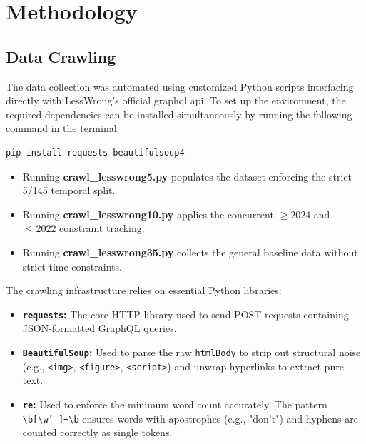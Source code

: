 \documentclass[12pt, a4paper]{article}
\begin{document}
\section{Methodology}

\subsection{Data Crawling}
The data collection was automated using customized Python scripts interfacing directly with LessWrong's official graphql api. To set up the environment, the required dependencies can be installed simultaneously by running the following command in the terminal:

\begin{center}
\begin{minipage}{0.55\textwidth}
\begin{lstlisting}[language=bash]
pip install requests beautifulsoup4
\end{lstlisting}
\end{minipage}
\end{center}

\begin{itemize}
    \item Running \textbf{crawl\_lesswrong5.py} populates the dataset enforcing the strict 5/145 temporal split.
    \item Running \textbf{crawl\_lesswrong10.py} applies the concurrent $\ge 2024$ and $\le 2022$ constraint tracking.
    \item Running \textbf{crawl\_lesswrong35.py} collects the general baseline data without strict time constraints.
\end{itemize}

The crawling infrastructure relies on essential Python libraries:
\begin{itemize}
    \item \textbf{\texttt{requests}:} The core HTTP library used to send POST requests containing JSON-formatted GraphQL queries.
    \item \textbf{\texttt{BeautifulSoup}:} Used to parse the raw \texttt{htmlBody} to strip out structural noise (e.g., \texttt{<img>}, \texttt{<figure>}, \texttt{<script>}) and unwrap hyperlinks to extract pure text.
    \item \textbf{\texttt{re}:} Used to enforce the minimum word count accurately. The pattern \texttt{\textbackslash b[\textbackslash w'-]+\textbackslash b} ensures words with apostrophes (e.g., "don't") and hyphens are counted correctly as single tokens.
\end{itemize}
\end{document}
